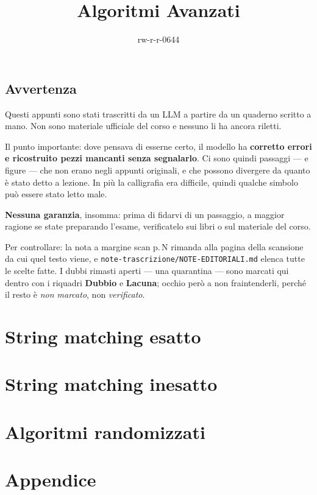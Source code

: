 \documentclass[oneside]{academica}
\title{Algoritmi Avanzati}
\author{rw-r-r-0644}
\date{}
\begin{document}
\frontmatter
\maketitle

\chapter*{Avvertenza}

\begin{note}
Questi appunti sono stati trascritti da un LLM a partire da un quaderno scritto a
mano. Non sono materiale ufficiale del corso e nessuno li ha ancora riletti.

Il punto importante: dove pensava di esserne certo, il modello ha \textbf{corretto
errori e ricostruito pezzi mancanti senza segnalarlo}. Ci sono quindi passaggi ---
e figure --- che non erano negli appunti originali, e che possono divergere da
quanto è stato detto a lezione. In più la calligrafia era difficile, quindi
qualche simbolo può essere stato letto male.

\textbf{Nessuna garanzia}, insomma: prima di fidarvi di un passaggio, a maggior
ragione se state preparando l'esame, verificatelo sui libri o sul materiale del
corso.

Per controllare: la nota a margine \textsf{scan p.\,N} rimanda alla pagina della
scansione da cui quel testo viene, e \texttt{note-trascrizione/NOTE-EDITORIALI.md}
elenca tutte le scelte fatte. I dubbi rimasti aperti --- una quarantina --- sono
marcati qui dentro con i riquadri \textbf{Dubbio} e \textbf{Lacuna}; occhio però a
non fraintenderli, perché il resto è \emph{non marcato}, non \emph{verificato}.
\end{note}

\tableofcontents

\mainmatter

\part{String matching esatto}









\part{String matching inesatto}



\part{Algoritmi randomizzati}







\appendix
\part{Appendice}

\end{document}
